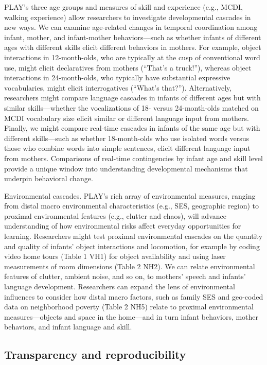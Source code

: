 \documentclass[english,man]{apa6}
\theoremstyle{definition}
\theoremstyle{definition}
\theoremstyle{definition}
\theoremstyle{remark}
\begin{document}
PLAY's three age groups and measures of skill and experience (e.g.,
MCDI, walking experience) allow researchers to investigate developmental
cascades in new ways. We can examine age-related changes in temporal
coordination among infant, mother, and infant-mother behaviors---such as
whether infants of different ages with different skills elicit different
behaviors in mothers. For example, object interactions in 12-month-olds,
who are typically at the cusp of conventional word use, might elicit
declaratives from mothers (\enquote{That's a truck!}), whereas object
interactions in 24-month-olds, who typically have substantial expressive
vocabularies, might elicit interrogatives (\enquote{What's that?}).
Alternatively, researchers might compare language cascades in infants of
different ages but with similar skills---whether the vocalizations of
18- versus 24-month-olds matched on MCDI vocabulary size elicit similar
or different language input from mothers. Finally, we might compare
real-time cascades in infants of the same age but with different
skills---such as whether 18-month-olds who use isolated words versus
those who combine words into simple sentences, elicit different language
input from mothers. Comparisons of real-time contingencies by infant age
and skill level provide a unique window into understanding developmental
mechanisms that underpin behavioral change.

Environmental cascades. PLAY's rich array of environmental measures,
ranging from distal macro environmental characteristics (e.g., SES,
geographic region) to proximal environmental features (e.g., clutter and
chaos), will advance understanding of how environmental risks affect
everyday opportunities for learning. Researchers might test proximal
environmental cascades on the quantity and quality of infants' object
interactions and locomotion, for example by coding video home tours
(Table 1 VH1) for object availability and using laser measurements of
room dimensions (Table 2 NH2). We can relate environmental features of
clutter, ambient noise, and so on, to mothers' speech and infants'
language development. Researchers can expand the lens of environmental
influences to consider how distal macro factors, such as family SES and
geo-coded data on neighborhood poverty (Table 2 NH5) relate to proximal
environmental measures---objects and space in the home---and in turn
infant behaviors, mother behaviors, and infant language and skill.

\subsection{Transparency and
reproducibility}\label{transparency-and-reproducibility}
\end{document}
